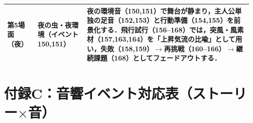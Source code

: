 \begin{table}[h]
\begin{tabular}{p{1.8cm} p{4.4cm} p{8.6cm}}
		第5場面（夜）     & 夜の虫・夜環境（イベント150,151）                   & 夜の環境音（150,151）で舞台が静まり，主人公単独の足音（152,153）と行動準備（154,155）を前景化する．飛行試行（156--168）では，突風・風素材（157,163,164）を「上昇気流の比喩」として用い，失敗（158,159）$\to$再挑戦（160--166）$\to$継続課題（168）としてフェードアウトする．                                                                                                   \\
		\hline
	\end{tabular}
\end{table}



\clearpage

\section*{付録C：音響イベント対応表（ストーリー$\times$音）}
\scriptsize
